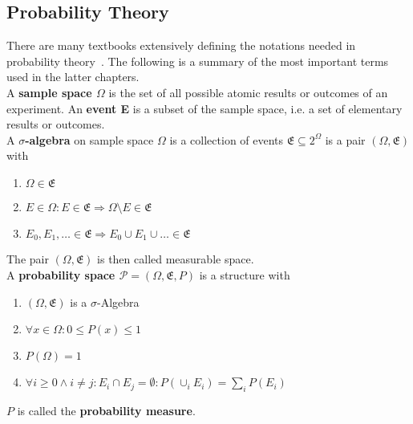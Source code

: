 \subsection{Probability Theory}\label{\positionnumber}
There are many textbooks extensively defining the notations needed in probability theory~\cite{Baron:2013:PSC:2536837, fahrmeir2016statistik}. The following is a summary of the most important terms used in the latter chapters.\\

A \textbf{sample space $\Omega$} is the set of all possible atomic results or outcomes of an experiment. An \textbf{event E} is a subset of the sample space, i.e. a set of elementary results or outcomes.  \\

A \textbf{$\sigma$-algebra} on sample space $\Omega$ is a collection of events $\mathfrak{E} \subseteq 2^{\Omega}$ is a pair $(\Omega, \mathfrak{E})$ with
\begin{enumerate}
    \item $\Omega \in \mathfrak{E}$
    \item $E \in \Omega: E \in \mathfrak{E} \Rightarrow \Omega \setminus E \in \mathfrak{E}$
    \item $E_0, E_1, \dots \in \mathfrak{E} \Rightarrow E_0 \cup E_1 \cup \dots \in \mathfrak{E}$
\end{enumerate}
The pair $(\Omega, \mathfrak{E})$ is then called measurable space. \\

A \textbf{probability space $\mathcal{P} = (\Omega, \mathfrak{E}, P)$} is a structure with
\begin{enumerate}
    \item $(\Omega, \mathfrak{E})$ is a $\sigma$-Algebra
    \item $\forall x \in \Omega: 0 \leq P(x) \leq 1$
    \item $P(\Omega) = 1$
    \item $\forall i \geq 0 \wedge i \neq j: E_i \cap E_j = \emptyset: P(\cup_i E_i) = \sum_i P(E_i)$ 
\end{enumerate}
$P$ is called the \textbf{probability measure}.
\vspace{0.5cm}

